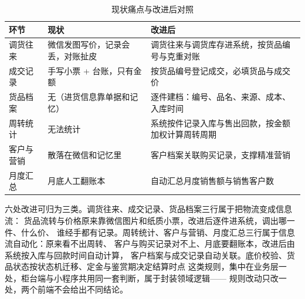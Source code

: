 \begin{table}[H]
\centering
\caption{现状痛点与改进后对照}
\begin{tabularx}{\textwidth}{@{}L{3.2cm} Y Y@{}}
\toprule
环节 & 现状 & 改进后 \\
\midrule
调货往来 & 微信发图写价，记录会丢，对账扯皮 & 调货往来与调货库存进系统，按货品编号与克重对账 \\
成交记录 & 手写小票 + 台账，只有金额 & 按货品编号登记成交，必填货品与成交价 \\
货品档案 & 无（进货信息靠单据和记忆） & 逐件建档：编号、品名、来源、成本、入库时间 \\
周转统计 & 无法统计 & 系统按件记录入库与售出回款，按金额加权计算周转周期 \\
客户与营销 & 散落在微信和记忆里 & 客户档案关联购买记录，支撑精准营销 \\
月度汇总 & 月底人工翻账本 & 自动汇总月度销售额与销售客户数 \\
\bottomrule
\end{tabularx}
\end{table}

六处改进可归为三类。调货往来、成交记录、货品档案三行属于把物流变成信息流：
货品流转与价格原来靠微信图片和纸质小票，改进后逐件进系统，调出哪一件、什么价、
谁经手都有记录。周转统计、客户与营销、月度汇总三行属于信息流自动化：原来看不出周转、
客户与购买记录对不上、月底要翻账本，改进后由系统按入库与回款时间自动计算，
客户档案与成交记录自动关联。底价校验、货品状态按状态机迁移、定金与鉴赏期决定结算时点
这类规则，集中在业务层一处，柜台端与小程序共用同一套判断，属于封装领域逻辑——
规则改动只改一处，两个前端不会给出不同结论。

